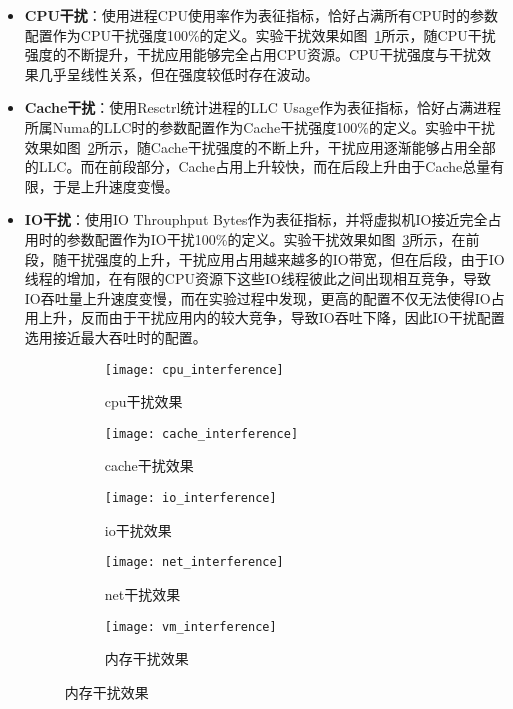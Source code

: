 \begin{itemize}
    \item \textbf{CPU干扰}：使用进程CPU使用率作为表征指标，恰好占满所有CPU时的参数配置作为CPU干扰强度100\%的定义。实验干扰效果如图~\ref{fig:cpu_interference}所示，随CPU干扰强度的不断提升，干扰应用能够完全占用CPU资源。CPU干扰强度与干扰效果几乎呈线性关系，但在强度较低时存在波动。
    
    \item \textbf{Cache干扰}：使用Resctrl统计进程的LLC Usage作为表征指标，恰好占满进程所属Numa的LLC时的参数配置作为Cache干扰强度100\%的定义。实验中干扰效果如图~\ref{fig:cache_interference}所示，随Cache干扰强度的不断上升，干扰应用逐渐能够占用全部的LLC。而在前段部分，Cache占用上升较快，而在后段上升由于Cache总量有限，于是上升速度变慢。

    \item \textbf{IO干扰}：使用IO Throuphput Bytes作为表征指标，并将虚拟机IO接近完全占用时的参数配置作为IO干扰100\%的定义。实验干扰效果如图~\ref{fig:io_interference}所示，在前段，随干扰强度的上升，干扰应用占用越来越多的IO带宽，但在后段，由于IO线程的增加，在有限的CPU资源下这些IO线程彼此之间出现相互竞争，导致IO吞吐量上升速度变慢，而在实验过程中发现，更高的配置不仅无法使得IO占用上升，反而由于干扰应用内的较大竞争，导致IO吞吐下降，因此IO干扰配置选用接近最大吞吐时的配置。

\begin{figure}[H]
  \centering
  \begin{subfigure}[b]{0.32\textwidth}
    \texttt{[image: cpu\_interference]}
    \caption{cpu干扰效果}
    \label{fig:cpu_interference}
  \end{subfigure}
  \begin{subfigure}[b]{0.32\textwidth}
    \texttt{[image: cache\_interference]}
    \caption{cache干扰效果}
    \label{fig:cache_interference}
  \end{subfigure}
  \begin{subfigure}[b]{0.32\textwidth}
    \texttt{[image: io\_interference]}
    \caption{io干扰效果}
    \label{fig:io_interference}
  \end{subfigure}
  \begin{subfigure}[b]{0.32\textwidth}
    \texttt{[image: net\_interference]}
    \caption{net干扰效果}
    \label{fig:net_interference}
  \end{subfigure}
  \begin{subfigure}[b]{0.32\textwidth}
    \texttt{[image: vm\_interference]}
    \caption{内存干扰效果}
    \label{fig:vm_interference}
  \end{subfigure}
  \label{fig:interference}
\end{figure}


\end{itemize}
